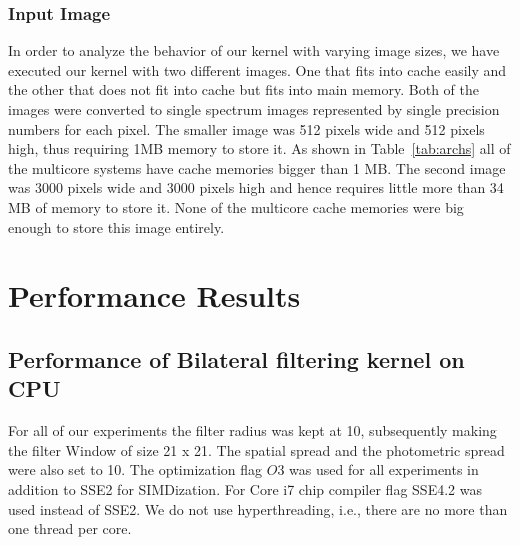 \documentclass{IEEEtran}
\begin{document}
\subsubsection{Input Image}
In order to analyze the behavior of our kernel with varying image sizes, we have executed our kernel with two different images. One that fits into cache easily and the other that does not fit into cache but fits into main memory. Both of the images were converted to single spectrum images represented by single precision numbers for each pixel. The smaller image was 512 pixels wide and 512 pixels high, thus requiring 1MB memory to store it. As shown in Table~\ref{tab:archs} all of the multicore systems have cache memories bigger than 1 MB. The second image was 3000 pixels wide and 3000 pixels high and hence requires little more than 34 MB of memory to store it. None of the multicore cache memories were big enough to store this image entirely.

\section{Performance Results}
\label{sec:results}
\subsection{Performance of Bilateral filtering kernel on CPU}
For all of our experiments the filter radius was kept at 10, subsequently making the filter Window of size 21 x 21. The spatial spread and the photometric spread were also set to 10. The optimization flag $O3$ was used for all experiments in addition to SSE2 for SIMDization. For Core i7 chip compiler flag SSE4.2 was used instead of SSE2. We do not use hyperthreading, i.e., there are no more than one thread per core. 
\end{document}
